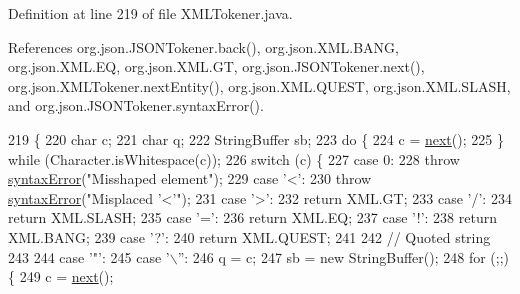 Definition at line 219 of file X\-M\-L\-Tokener.\-java.



References org.\-json.\-J\-S\-O\-N\-Tokener.\-back(), org.\-json.\-X\-M\-L.\-B\-A\-N\-G, org.\-json.\-X\-M\-L.\-E\-Q, org.\-json.\-X\-M\-L.\-G\-T, org.\-json.\-J\-S\-O\-N\-Tokener.\-next(), org.\-json.\-X\-M\-L\-Tokener.\-next\-Entity(), org.\-json.\-X\-M\-L.\-Q\-U\-E\-S\-T, org.\-json.\-X\-M\-L.\-S\-L\-A\-S\-H, and org.\-json.\-J\-S\-O\-N\-Tokener.\-syntax\-Error().


\begin{DoxyCode}
219                                                    \{
220         \textcolor{keywordtype}{char} c;
221         \textcolor{keywordtype}{char} q;
222         StringBuffer sb;
223         \textcolor{keywordflow}{do} \{
224             c = \hyperlink{classorg_1_1json_1_1_j_s_o_n_tokener_ae129753dbe43ea50aa34e3c06773fdfb}{next}();
225         \} \textcolor{keywordflow}{while} (Character.isWhitespace(c));
226         \textcolor{keywordflow}{switch} (c) \{
227         \textcolor{keywordflow}{case} 0:
228             \textcolor{keywordflow}{throw} \hyperlink{classorg_1_1json_1_1_j_s_o_n_tokener_a467f559950c039f28394ce3a0d2659ca}{syntaxError}(\textcolor{stringliteral}{"Misshaped element"});
229         \textcolor{keywordflow}{case} \textcolor{charliteral}{'<'}:
230             \textcolor{keywordflow}{throw} \hyperlink{classorg_1_1json_1_1_j_s_o_n_tokener_a467f559950c039f28394ce3a0d2659ca}{syntaxError}(\textcolor{stringliteral}{"Misplaced '<'"});
231         \textcolor{keywordflow}{case} \textcolor{charliteral}{'>'}:
232             \textcolor{keywordflow}{return} XML.GT;
233         \textcolor{keywordflow}{case} \textcolor{charliteral}{'/'}:
234             \textcolor{keywordflow}{return} XML.SLASH;
235         \textcolor{keywordflow}{case} \textcolor{charliteral}{'='}:
236             \textcolor{keywordflow}{return} XML.EQ;
237         \textcolor{keywordflow}{case} \textcolor{charliteral}{'!'}:
238             \textcolor{keywordflow}{return} XML.BANG;
239         \textcolor{keywordflow}{case} \textcolor{charliteral}{'?'}:
240             \textcolor{keywordflow}{return} XML.QUEST;
241 
242 \textcolor{comment}{// Quoted string}
243 
244         \textcolor{keywordflow}{case} \textcolor{charliteral}{'"'}:
245         \textcolor{keywordflow}{case} \textcolor{charliteral}{'\(\backslash\)''}:
246             q = c;
247             sb = \textcolor{keyword}{new} StringBuffer();
248             \textcolor{keywordflow}{for} (;;) \{
249                 c = \hyperlink{classorg_1_1json_1_1_j_s_o_n_tokener_ae129753dbe43ea50aa34e3c06773fdfb}{next}();

\end{DoxyCode}
